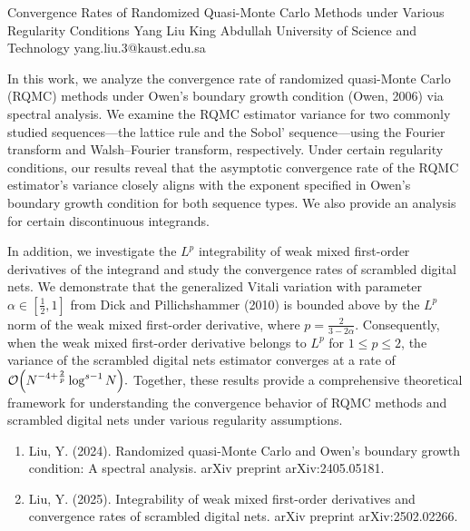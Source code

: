 \begin{talk}
  {Convergence Rates of Randomized Quasi-Monte Carlo Methods under Various Regularity Conditions}%
  {Yang Liu}%
  {King Abdullah University of Science and Technology}%
  {yang.liu.3@kaust.edu.sa}%
  
    
        
        In this work, we analyze the convergence rate of randomized quasi-Monte Carlo (RQMC) methods under Owen's boundary growth condition (Owen, 2006) via spectral analysis. We examine the RQMC estimator variance for two commonly studied sequences—the lattice rule and the Sobol' sequence—using the Fourier transform and Walsh--Fourier transform, respectively. Under certain regularity conditions, our results reveal that the asymptotic convergence rate of the RQMC estimator's variance closely aligns with the exponent specified in Owen's boundary growth condition for both sequence types. We also provide an analysis for certain discontinuous integrands.

        In addition, we investigate the \(L^p\) integrability of weak mixed first-order derivatives of the integrand and study the convergence rates of scrambled digital nets. We demonstrate that the generalized Vitali variation with parameter \(\alpha \in \left[\frac{1}{2}, 1\right]\) from Dick and Pillichshammer (2010) is bounded above by the \(L^p\) norm of the weak mixed first-order derivative, where \(p = \frac{2}{3-2\alpha}\). Consequently, when the weak mixed first-order derivative belongs to \(L^p\) for \(1 \leq p \leq 2\), the variance of the scrambled digital nets estimator converges at a rate of
        \(
        \mathcal{O}\Bigl(N^{-4+\frac{2}{p}} \log^{s-1} N\Bigr).
        \)
        Together, these results provide a comprehensive theoretical framework for understanding the convergence behavior of RQMC methods and scrambled digital nets under various regularity assumptions.
        

\medskip

\begin{enumerate}
 \item[{[1]}] Liu, Y. (2024). Randomized quasi-Monte Carlo and Owen's boundary growth condition: A spectral analysis. arXiv preprint arXiv:2405.05181.
 \item[{[2]}] Liu, Y. (2025). Integrability of weak mixed first-order derivatives and convergence rates of scrambled digital nets. arXiv preprint arXiv:2502.02266.
\end{enumerate}

\end{talk}


